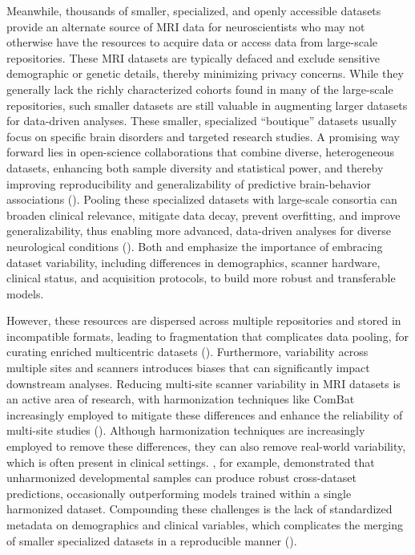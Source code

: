 Meanwhile, thousands of smaller, specialized, and openly accessible datasets 
provide an alternate source of MRI data for neuroscientists 
who may not otherwise have the resources to acquire data or access data from large-scale repositories. 
These MRI datasets are typically defaced and exclude sensitive demographic or genetic details, 
thereby minimizing privacy concerns.
While they generally lack the richly characterized cohorts found in many of the large-scale repositories, 
such smaller datasets are still valuable in augmenting larger datasets for data-driven analyses. 
These smaller, specialized ``boutique'' datasets usually focus on specific brain disorders and targeted research studies. 
A promising way forward lies in open-science collaborations that combine diverse, 
heterogeneous datasets, enhancing both sample diversity and statistical power, 
and thereby improving reproducibility and generalizability 
of predictive brain-behavior associations (\cite{marek2024replicability, adkinson2024brain, yang2024limits}). 
Pooling these specialized datasets with large-scale consortia can broaden clinical relevance, 
mitigate data decay, prevent overfitting, and improve generalizability, 
thus enabling more advanced, data-driven analyses for diverse neurological conditions
(\cite{horien2021hitchhiker, marek2024replicability, adkinson2024brain, yang2024limits}).
Both \cite{kiar2024experimental} and \cite{adkinson2024brain} emphasize the importance 
of embracing dataset variability, including differences in demographics, 
scanner hardware, clinical status, and acquisition protocols, to build more 
robust and transferable models. 

However, these resources are dispersed across multiple repositories and stored in incompatible formats, 
leading to fragmentation that complicates data pooling, for curating enriched multicentric datasets (\cite{dishner2024survey}). 
Furthermore, variability across multiple sites and scanners introduces biases that can significantly 
impact downstream analyses. 
Reducing multi-site scanner variability in MRI datasets is an active area of research, 
with harmonization techniques like ComBat increasingly employed to mitigate these differences 
and enhance the reliability of multi-site studies (\cite{fortin2017harmonization, fortin2018harmonization}).
Although harmonization techniques are increasingly employed to remove these differences, 
they can also remove real-world variability, which is often present in clinical settings. 
\cite{adkinson2024brain}, for example, demonstrated that unharmonized developmental samples 
can produce robust cross-dataset predictions, occasionally outperforming models trained 
within a single harmonized dataset. 
Compounding these challenges is the lack of standardized metadata on demographics and clinical variables, 
which complicates the merging of smaller specialized datasets in a reproducible manner (\cite{pomponio2019harmonization}).

